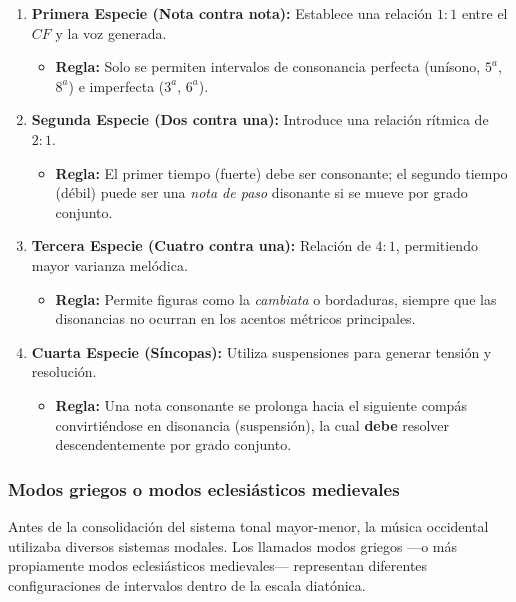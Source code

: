 \documentclass[12pt]{report}
\begin{document}
\begin{enumerate}
    \item \textbf{Primera Especie (Nota contra nota):} Establece una relación $1:1$ entre el $CF$ y la voz generada. 
    \begin{itemize}
        \item \textbf{Regla:} Solo se permiten intervalos de consonancia perfecta (unísono, $5^{a}$, $8^{a}$) e imperfecta ($3^{a}$, $6^{a}$).
    \end{itemize}

    \item \textbf{Segunda Especie (Dos contra una):} Introduce una relación rítmica de $2:1$. 
    \begin{itemize}
        \item \textbf{Regla:} El primer tiempo (fuerte) debe ser consonante; el segundo tiempo (débil) puede ser una \textit{nota de paso} disonante si se mueve por grado conjunto.
    \end{itemize}

    \item \textbf{Tercera Especie (Cuatro contra una):} Relación de $4:1$, permitiendo mayor varianza melódica.
    \begin{itemize}
        \item \textbf{Regla:} Permite figuras como la \textit{cambiata} o bordaduras, siempre que las disonancias no ocurran en los acentos métricos principales.
    \end{itemize}

    \item \textbf{Cuarta Especie (Síncopas):} Utiliza suspensiones para generar tensión y resolución.
    \begin{itemize}
        \item \textbf{Regla:} Una nota consonante se prolonga hacia el siguiente compás convirtiéndose en disonancia (suspensión), la cual \textbf{debe} resolver descendentemente por grado conjunto.
     \end{itemize}
\end{enumerate}


\subsubsection{Modos griegos o modos eclesiásticos medievales}

Antes de la consolidación del sistema tonal mayor-menor, la música occidental utilizaba diversos sistemas modales. Los llamados modos griegos —o más propiamente modos eclesiásticos medievales— representan diferentes configuraciones de intervalos dentro de la escala diatónica.
\end{document}
